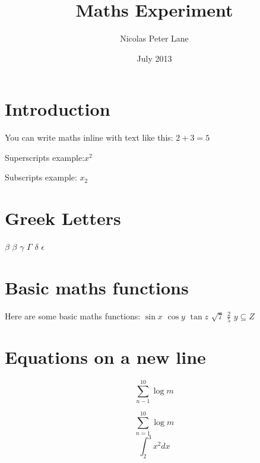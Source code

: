 \documentclass[a4paper]{article}
\title{Maths Experiment}
\author{Nicolas Peter Lane}
\date{July 2013}
\begin{document}

\section{Introduction}
You can write maths inline with text like this: $ 2+3 = 5$

Superscripts example:$x^{2}$

Subscripts example: $x_{2}$

\section{Greek Letters}
$\beta$
$\beta$
$\gamma$
$\Gamma$
$\delta$
$\epsilon$

\section{Basic maths functions}
Here are some basic maths functions:
$\sin{x}$
$\cos{y}$
$\tan{z}$
$\sqrt{7}$
$\frac{2}{5}$
$y \subseteq Z$

\section{Equations on a new line}
\begin{equation}
\sum_{n-1}^{10} \log{m}
\end{equation}

\begin{equation}
\sum_{n=1}^{10} \log{m}
\end{equation}
\begin{equation*}
\int_{2}^{3} x^2 dx
\end{equation*}
\end{document}
